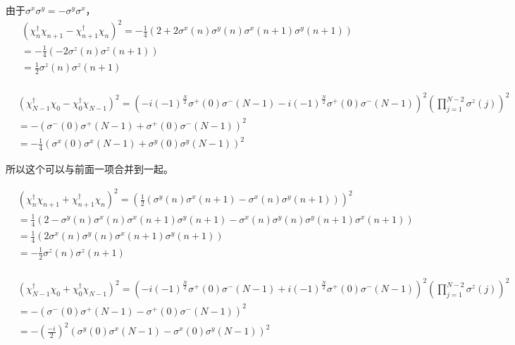 由于$\sigma ^x\sigma ^y = -\sigma ^y\sigma ^x$，
\begin{equation}
\begin{split}
&\left(\chi^{\dagger}_n\chi_{n+1}-\chi^{\dagger}_{n+1}\chi _n\right)^2 = -\frac{1}{4}\left(2+2\sigma ^x(n)\sigma ^y(n)\sigma ^x(n+1)\sigma ^y(n+1)\right)\\
&= -\frac{1}{4}\left(-2\sigma ^z(n)\sigma ^z(n+1)\right)\\
&=\frac{1}{2}\sigma ^z(n)\sigma ^z(n+1)\\
\end{split}
\end{equation}

\begin{equation}
\begin{split}
&\left(\chi^{\dagger}_{N-1}\chi_{0}-\chi^{\dagger}_{0}\chi _{N-1}\right)^2 = \left(-i(-1)^{\frac{N}{2}}\sigma ^+(0)\sigma ^-(N-1)-i(-1)^{\frac{N}{2}}\sigma ^+(0)\sigma ^-(N-1)\right)^2\left(\prod _{j=1}^{N-2}\sigma ^z(j)\right)^2\\
&=-\left(\sigma ^-(0)\sigma ^+(N-1)+\sigma ^+(0)\sigma ^-(N-1)\right)^2\\
&=-\frac{1}{4}\left(\sigma ^x(0)\sigma ^x(N-1)+\sigma ^y(0)\sigma ^y(N-1)\right)^2
\end{split}
\end{equation}

所以这个可以与前面一项合并到一起。

\begin{equation}
\begin{split}
&\left(\chi^{\dagger}_n\chi_{n+1}+\chi^{\dagger}_{n+1}\chi _n\right)^2 = \left(\frac{1}{2}\left(\sigma ^y(n)\sigma ^x(n+1)-\sigma ^x(n)\sigma ^y(n+1)\right)\right)^2\\
&=\frac{1}{4}\left(2-\sigma ^y(n)\sigma ^x(n)\sigma ^x(n+1)\sigma ^y(n+1)-\sigma ^x(n)\sigma ^y(n)\sigma ^y(n+1)\sigma ^x(n+1)\right)\\
&=\frac{1}{4}\left(2\sigma ^x(n)\sigma ^y(n)\sigma ^x(n+1)\sigma ^y(n+1)\right)\\
&=-\frac{1}{2}\sigma ^z(n)\sigma ^z(n+1)\\
\end{split}
\end{equation}

\begin{equation}
\begin{split}
&\left(\chi^{\dagger}_{N-1}\chi_{0}+\chi^{\dagger}_{0}\chi _{N-1}\right)^2 = \left(-i(-1)^{\frac{N}{2}}\sigma ^+(0)\sigma ^-(N-1)+i(-1)^{\frac{N}{2}}\sigma ^+(0)\sigma ^-(N-1)\right)^2\left(\prod _{j=1}^{N-2}\sigma ^z(j)\right)^2\\
&=-\left(\sigma ^-(0)\sigma ^+(N-1)-\sigma ^+(0)\sigma ^-(N-1)\right)^2\\
&=-\left(\frac{-i}{2}\right)^2\left(\sigma ^y(0)\sigma ^x(N-1)-\sigma ^x(0)\sigma ^y(N-1)\right)^2
\end{split}
\end{equation}

